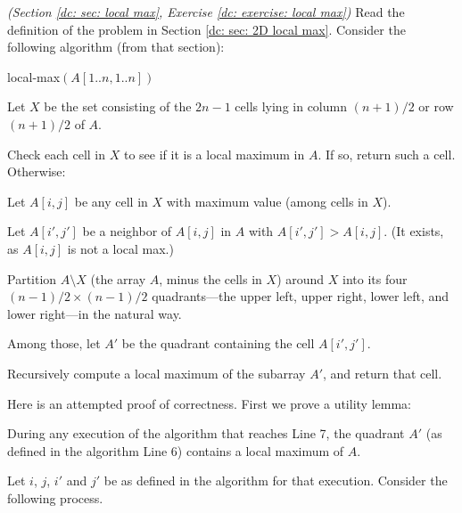 \documentclass[11pt]{article}
\begin{document}




\newpage

{\small
  \problem \emph{(Section \ref{dc: sec: local max}, Exercise \ref{dc: exercise: local max})}
  Read the definition of the  problem in Section \ref{dc: sec: 2D local max}.
  Consider the following algorithm (from that section):
  \begin{myframed}
    \begin{steps}
    \item[] {\sf local-max}$(A[1..n, 1..n])$ 

      \step Let $X$ be the set consisting of the $2n-1$ cells lying in column $(n+1)/2$ or row $(n+1)/2$ of $A$.

      \step Check each cell in $X$ to see if it is a local maximum in $A$.  If so, return such a cell.  Otherwise:

      \step Let $A[i, j]$ be any cell in $X$ with maximum value (among cells in $X$).

      \step Let $A[i', j']$ be a neighbor of $A[i,j]$ in $A$ with $A[i', j'] > A[i,j]$.  (It exists, as $A[i,j]$ is not a local max.)

      \step Partition $A \setminus X$ (the array $A$, minus the cells in $X$) around $X$ into its four
      $(n-1)/2 \times (n-1)/2$ quadrants---the upper left, upper right, lower left, and lower right---in the natural way.

      \step Among those, let $A'$ be the quadrant containing the cell $A[i', j']$.

      \step Recursively compute a local maximum of the subarray $A'$, and return that cell.
    \end{steps}
  \end{myframed}

  Here is an attempted proof of correctness.
  First we prove a utility lemma:
  \begin{lemma}\label{lemma: utility}
    During any execution of the algorithm that reaches Line 7,
    the quadrant $A'$ (as defined in the algorithm Line 6) contains a local maximum of $A$.
  \end{lemma}
  \begin{longFormProof}
    \step Let $i$, $j$, $i'$ and $j'$ be as defined in the algorithm for that execution.  Consider the following process.
    

\end{longFormProof}}
\end{document}
